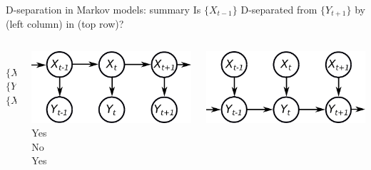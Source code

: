 \documentclass{beamer}
\begin{document}
\begin{frame}{D-separation in Markov models: summary}
Is $\{X_{t-1}\}$ D-separated from $\{Y_{t+1}\}$ by (left column) in (top row)?\vspace{5mm}
\begin{columns}
 \begin{column}{1cm}
 $ $\vspace{1.8cm}\\
 $\{X_t\}$\vspace{.5cm}\\
 $\{Y_t\}$\vspace{.5cm}\\
 $\{X_t,Y_t\}$
 \end{column}
 \begin{column}{0.25\textwidth}
 \centering
  \includegraphics[width=\textwidth]{fig/temporal-hmm.pdf}\vspace{3mm}\\
  Yes\vspace{.5cm}\\
  No\vspace{.5cm}\\
  Yes
 \end{column}\hspace{3mm}
  \begin{column}{0.25\textwidth}
 \centering
  \includegraphics[width=\textwidth]{fig/temporal-omm.pdf}\vspace{3mm}\\

\end{column}
\end{columns}
\end{frame}
\end{document}
